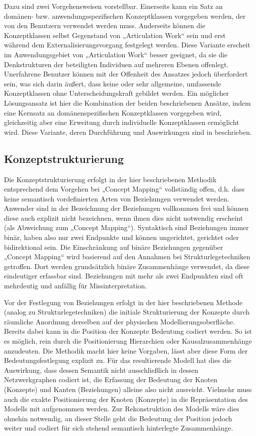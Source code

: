 Dazu sind zwei Vorgehensweisen vorstellbar. Einerseits kann ein Satz an domänen- bzw. anwendungsspezifischen Konzeptklassen vorgegeben werden, der von den Benutzern verwendet werden muss. Anderseits können die Konzeptklassen selbst Gegenstand von „Articulation Work“ sein und erst während dem Externalisierungsvorgang festgelegt werden. Diese Variante erscheit im Anwendungsgebiet von „Articulation Work“ besser geeignet, da sie die Denkstrukturen der beteiligten Individuen auf mehreren Ebenen offenlegt. Unerfahrene Benutzer können mit der Offenheit des Ansatzes jedoch überfordert sein, was sich darin äußert, dass keine oder sehr allgemeine, umfassende Konzeptklassen ohne Unterscheidungskraft gebildet werden. Ein möglicher Lösungsansatz ist hier die Kombination der beiden beschriebenen Ansätze, indem eine Kernsatz an domänenspezifischen Konzeptklassen vorgegeben wird, gleichzeitig aber eine Erweitung durch individuelle Konzeptklassen ermöglicht wird. Diese Variante, deren Durchführung und Auswirkungen sind in \citet{Oppl05} beschrieben. 

\subsection{Konzeptstrukturierung}

Die Konzeptstrukturierung erfolgt in der hier beschriebenen Methodik entsprechend dem Vorgehen bei „Concept Mapping“ vollständig offen, d.h. dass keine semantisch vordefinierten Arten von Beziehungen verwendet werden. Anwender sind in der Bezeichnung der Beziehungen vollkommen frei und können diese auch explizit nicht bezeichnen, wenn ihnen dies nicht notwendig erscheint (als Abweichung zum „Concept Mapping“). Syntaktisch sind Beziehungen immer binär, haben also nur zwei Endpunkte und können ungerichtet, gerichtet oder bidirektional sein. Die Einschränkung auf binäre Beziehungen gegenüber „Concept Mapping“ wird basierend auf den Annahmen bei Strukturlegetechniken getroffen. Dort werden grundsätzlich binäre Zusammenhänge verwendet, da diese eindeutiger erfassbar sind. Beziehungen mit mehr als zwei Endpunkten sind oft mehrdeutig und anfällig für Missinterpretation.

Vor der Festlegung von Beziehungen erfolgt in der hier beschriebenen Methode (analog zu Strukturlegetechniken) die initiale Strukturierung der Konzepte durch räumliche Anordnung derselben auf der physischen Modellierungsoberfläche. Bereits dabei kann in die Position der Konzepte Bedeutung codiert werden. So ist es möglich, rein durch die Positionierung Hierarchien oder Kausalzusammenhänge anzudeuten. Die Methodik macht hier keine Vorgaben, lässt aber diese Form der Bedeutungsfestlegung explizit zu. Für das resultierende Modell hat dies die Auswirkung, dass dessen Semantik nicht ausschließlich in dessen Netzwerkgraphen codiert ist, die Erfassung der Bedeutung der Knoten (Konzepte) und Kanten (Beziehungen) alleine also nicht ausreicht. Vielmehr muss auch die exakte Positionierung der Knoten (Konzepte) in die Repräsentation des Modells mit aufgenommen werden. Zur Rekonstruktion des Modells wäre dies ohnehin notwendig, an dieser Stelle geht die Bedeutung der Position jedoch weiter und codiert für sich stehend semantisch hinterlegte Zusammenhänge. 

